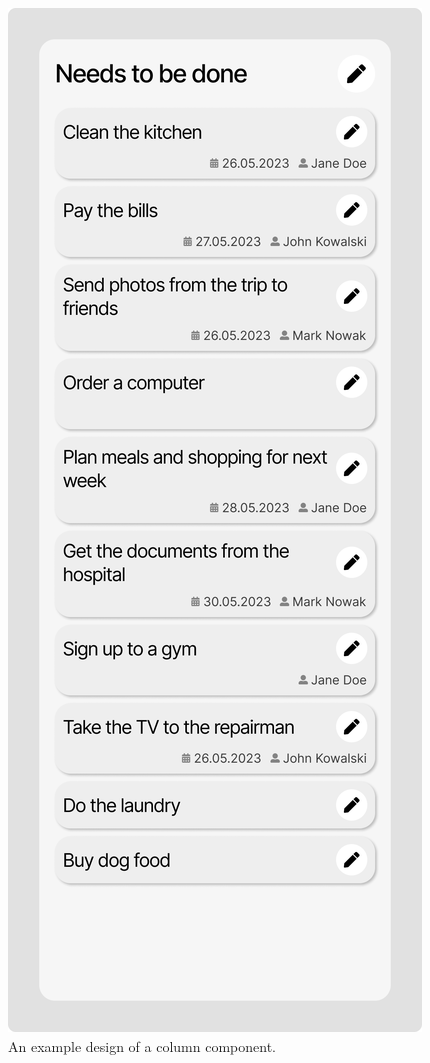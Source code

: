 \begin{figure}
    \centering
    \includegraphics[height=0.5\textheight]{./3-research-methodology/column-component}
    \caption{An example design of a column component.}
    \label{fig:3-4-column-component}
\end{figure}

